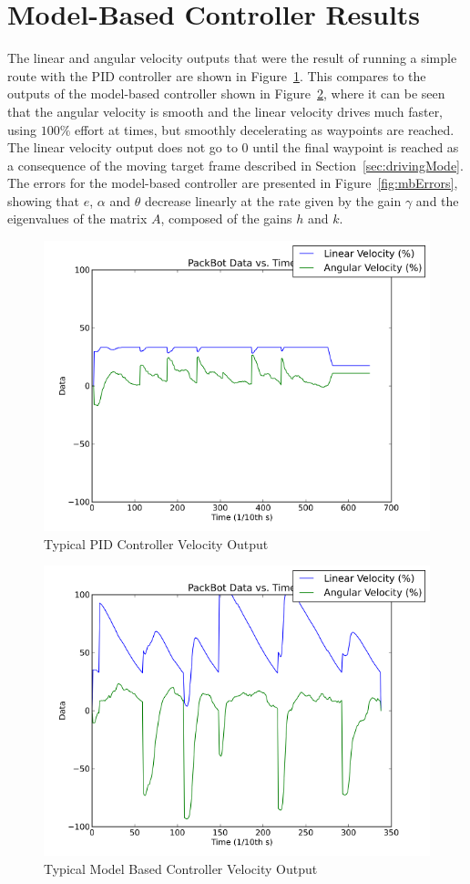 \section{Model-Based Controller Results}
\label{sec:lyapunovResults}
The linear and angular velocity outputs that were the result of running a simple route with the PID controller are shown in Figure~\ref{fig:pidOutput}. This compares to the outputs of the model-based controller shown in Figure~\ref{fig:mbOutput}, where it can be seen that the angular velocity is smooth and the linear velocity drives much faster, using $100\%$ effort at times, but smoothly decelerating as waypoints are reached. The linear velocity output does not go to $0$ until the final waypoint is reached as a consequence of the moving target frame described in Section~\ref{sec:drivingMode}. The errors for the model-based controller are presented in Figure~\ref{fig:mbErrors}, showing that $e$, $\alpha$ and $\theta$ decrease linearly at the rate given by the gain $\gamma$ and the eigenvalues of the matrix $A$, composed of the gains $h$ and $k$.

\begin{figure}[ht!]
\centering
\includegraphics[width=.5\textwidth]{images/pbtx/20110109_1815_pbtx_simpleDrivePID}
\caption{Typical PID Controller Velocity Output}
\label{fig:pidOutput}
\end{figure}

\begin{figure}[ht!]
\centering
\includegraphics[width=.5\textwidth]{images/pbtx/20110113_1451_pbtx_simpleDrive}
\caption{Typical Model Based Controller Velocity Output}
\label{fig:mbOutput}
\end{figure}

